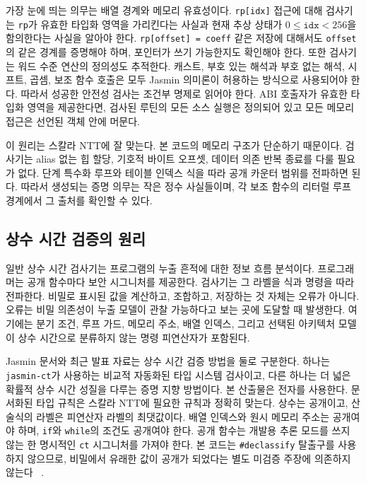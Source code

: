 \documentclass[10pt,twocolumn]{article}
\newcommand{\jasmin}{Jasmin}
\newcommand{\ct}{상수 시간}
\begin{document}
가장 눈에 띄는 의무는 배열 경계와 메모리 유효성이다.
\texttt{rp[idx]} 접근에 대해 검사기는 \texttt{rp}가 유효한 타입화
영역을 가리킨다는 사실과 현재 추상 상태가
\(0 \leq \texttt{idx} < 256\)을 함의한다는 사실을 알아야 한다.
\texttt{rp[offset] = coeff} 같은 저장에 대해서도 \texttt{offset}의 같은
경계를 증명해야 하며, 포인터가 쓰기 가능한지도 확인해야 한다. 또한
검사기는 워드 수준 연산의 정의성도 추적한다. 캐스트, 부호 있는 해석과
부호 없는 해석, 시프트, 곱셈, 보조 함수 호출은 모두 \jasmin{}
의미론이 허용하는 방식으로 사용되어야 한다. 따라서 성공한 안전성
검사는 조건부 명제로 읽어야 한다. ABI 호출자가 유효한 타입화 영역을
제공한다면, 검사된 루틴의 모든 소스 실행은 정의되어 있고 모든 메모리
접근은 선언된 객체 안에 머문다.

이 원리는 스칼라 NTT에 잘 맞는다. 본 코드의 메모리 구조가 단순하기
때문이다. 검사기는 alias 없는 힙 할당, 기호적 바이트 오프셋, 데이터
의존 반복 종료를 다룰 필요가 없다. 단계 특수화 루프와 테이블 인덱스
식을 따라 공개 카운터 범위를 전파하면 된다. 따라서 생성되는 증명
의무는 작은 정수 사실들이며, 각 보조 함수의 리터럴 루프 경계에서
그 출처를 확인할 수 있다.

\subsection{\ct{} 검증의 원리}

일반 \ct{} 검사기는 프로그램의 누출 흔적에 대한 정보 흐름 분석이다.
프로그래머는 공개 함수마다 보안 시그니처를 제공한다. 검사기는 그
라벨을 식과 명령을 따라 전파한다. 비밀로 표시된 값을 계산하고,
조합하고, 저장하는 것 자체는 오류가 아니다. 오류는 비밀 의존성이
누출 모델이 관찰 가능하다고 보는 곳에 도달할 때 발생한다. 여기에는
분기 조건, 루프 가드, 메모리 주소, 배열 인덱스, 그리고 선택된
아키텍처 모델이 상수 시간으로 분류하지 않는 명령 피연산자가 포함된다.

\jasmin{} 문서와 최근 발표 자료는 상수 시간 검증 방법을 둘로 구분한다.
하나는
\texttt{jasmin-ct}가 사용하는 비교적 자동화된 타입 시스템 검사이고,
다른 하나는 더 넓은 확률적 상수 시간 성질을 다루는 증명 지향 방법이다.
본 산출물은 전자를 사용한다. 문서화된 타입 규칙은 스칼라 NTT에 필요한
규칙과 정확히 맞는다. 상수는 공개이고, 산술식의 라벨은 피연산자 라벨의
최댓값이다. 배열 인덱스와 원시 메모리 주소는 공개여야 하며,
\texttt{if}와 \texttt{while}의 조건도 공개여야 한다. 공개 함수는 개발용
추론 모드를 쓰지 않는 한 명시적인 \texttt{ct} 시그니처를 가져야 한다.
본 코드는 \texttt{\#declassify} 탈출구를 사용하지 않으므로, 비밀에서
유래한 값이 공개가 되었다는 별도 미검증 주장에 의존하지 않는다
~\cite{JasminWorkbench2023,JasminFramework2026}.
\end{document}
